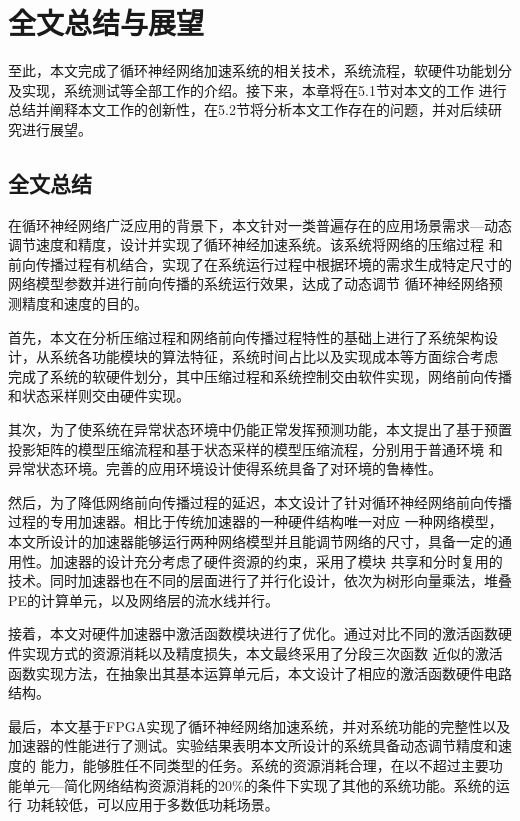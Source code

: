 \chapter{全文总结与展望}
至此，本文完成了循环神经网络加速系统的相关技术，系统流程，软硬件功能划分及实现，系统测试等全部工作的介绍。接下来，本章将在5.1节对本文的工作
进行总结并阐释本文工作的创新性，在5.2节将分析本文工作存在的问题，并对后续研究进行展望。
\section{全文总结}
在循环神经网络广泛应用的背景下，本文针对一类普遍存在的应用场景需求---动态调节速度和精度，设计并实现了循环神经加速系统。该系统将网络的压缩过程
和前向传播过程有机结合，实现了在系统运行过程中根据环境的需求生成特定尺寸的网络模型参数并进行前向传播的系统运行效果，达成了动态调节
循环神经网络预测精度和速度的目的。

首先，本文在分析压缩过程和网络前向传播过程特性的基础上进行了系统架构设计，从系统各功能模块的算法特征，系统时间占比以及实现成本等方面综合考虑
完成了系统的软硬件划分，其中压缩过程和系统控制交由软件实现，网络前向传播和状态采样则交由硬件实现。

其次，为了使系统在异常状态环境中仍能正常发挥预测功能，本文提出了基于预置投影矩阵的模型压缩流程和基于状态采样的模型压缩流程，分别用于普通环境
和异常状态环境。完善的应用环境设计使得系统具备了对环境的鲁棒性。

然后，为了降低网络前向传播过程的延迟，本文设计了针对循环神经网络前向传播过程的专用加速器。相比于传统加速器的一种硬件结构唯一对应
一种网络模型，本文所设计的加速器能够运行两种网络模型并且能调节网络的尺寸，具备一定的通用性。加速器的设计充分考虑了硬件资源的约束，采用了模块
共享和分时复用的技术。同时加速器也在不同的层面进行了并行化设计，依次为树形向量乘法，堆叠PE的计算单元，以及网络层的流水线并行。

接着，本文对硬件加速器中激活函数模块进行了优化。通过对比不同的激活函数硬件实现方式的资源消耗以及精度损失，本文最终采用了分段三次函数
近似的激活函数实现方法，在抽象出其基本运算单元后，本文设计了相应的激活函数硬件电路结构。

最后，本文基于FPGA实现了循环神经网络加速系统，并对系统功能的完整性以及加速器的性能进行了测试。实验结果表明本文所设计的系统具备动态调节精度和速度的
能力，能够胜任不同类型的任务。系统的资源消耗合理，在以不超过主要功能单元---简化网络结构资源消耗的20\%的条件下实现了其他的系统功能。系统的运行
功耗较低，可以应用于多数低功耗场景。


